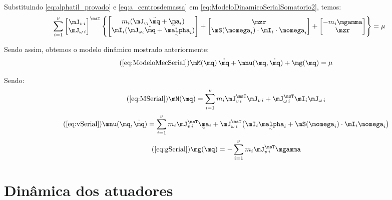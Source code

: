 \documentclass[]{politex}
\begin{document}
Substituindo \eqref{eq:alphatil_provado} e  \eqref{eq:a_centrosdemassa} em \eqref{eq:ModeloDinamicoSerialSomatorio2}, temos:
\begin{equation}
\sum_{i=1}^\nu
\begin{bmatrix}
\mJ_{v\,i} \\
\mJ_{\omega\,i}
\end{bmatrix}^\msT
\begin{Bmatrix}
\begin{bmatrix}
m_i (\mJ_{v_i} \ddot{\mq} + \underaccent{\sim}{\ma}_i   )  \\
 \mI_i (\mJ_{\omega_i} \ddot{\mq} + \underaccent{\sim}{\malpha}_i )
\end{bmatrix}
+
\begin{bmatrix}
\mzr \\
\mS( \momega_i ) \cdot \mI_i \cdot \momega_i
\end{bmatrix}
+
\begin{bmatrix}
-m_i \mgamma \\
\mzr
\end{bmatrix}
\end{Bmatrix}
=\mu
\end{equation}

Sendo assim, obtemos o modelo dinâmico mostrado anteriormente:
\begin{equation} \tag{\ref{eq:ModeloMecSerial}}
\mM(\mq) \, \ddot{\mq} + \mnu(\mq,\dot{\mq}) + \mg(\mq) = \mu
\end{equation}

Sendo:
\begin{equation} \tag{\ref{eq:MSerial}}
\mM(\mq) = \sum_{i=1}^\nu
m_i \mJ_{v\,i}^\msT \mJ_{v\,i} + \mJ_{\omega\,i}^\msT \mI_i \mJ_{\omega\,i}
\end{equation}
\begin{equation} \tag{\ref{eq:vSerial}}
\mnu(\mq, \dot{\mq}) = \sum_{i=1}^\nu
 m_i \mJ_{v\,i}^\msT \underaccent{\sim}{\ma}_i + \mJ_{\omega\,i}^\msT \big( \mI_i \underaccent{\sim}{\malpha}_i + \mS( \momega_i ) \cdot \mI_i  \momega_i \big)
\end{equation}
\begin{equation} \tag{\ref{eq:gSerial}}
\mg(\mq) = - \sum_{i=1}^\nu m_i \mJ_{v\,i}^\msT \mgamma
\end{equation}

\section{Dinâmica dos atuadores}
\end{document}

